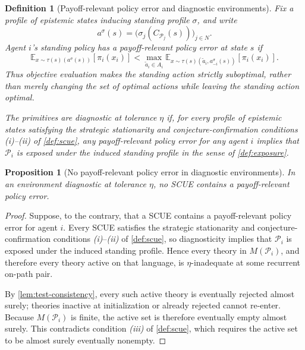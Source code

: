 \documentclass[11pt]{article}
\newtheorem{definition}[assumption]{Definition}
\newtheorem{proposition}[assumption]{Proposition}
\theoremstyle{definition}
\begin{document}
\begin{definition}[Payoff-relevant policy error and diagnostic environments]
\label{def:diagnostic}
Fix a profile of epistemic states inducing standing profile \(\sigma\), and write
\[
a^{\sigma}(s)
=
\bigl(
\sigma_j(C_{\mathcal P_j}(s))
\bigr)_{j\in N}.
\]
Agent \(i\)'s standing policy has a \emph{payoff-relevant policy error} at state \(s\) if
\[
\mathbb E_{x\sim\tau(s)(a^{\sigma}(s))}
\!\left[\pi_i(x_i)\right]
<
\max_{\widetilde a_i\in A_i}
\mathbb E_{x\sim
\tau(s)(\widetilde a_i,a_{-i}^{\sigma}(s))}
\!\left[\pi_i(x_i)\right].
\]
Thus objective evaluation makes the standing action strictly suboptimal, rather than merely changing the set of optimal actions while leaving the standing action optimal.

The primitives are \emph{diagnostic at tolerance \(\eta\)} if, for every profile of epistemic states satisfying the strategic stationarity and conjecture-confirmation conditions \emph{(i)}--\emph{(ii)} of \cref{def:scue}, any payoff-relevant policy error for any agent \(i\) implies that \(\mathcal P_i\) is exposed under the induced standing profile in the sense of \cref{def:exposure}.
\end{definition}

\begin{proposition}[No payoff-relevant policy error in diagnostic environments]
\label{prop:diagnostic}
In an environment diagnostic at tolerance \(\eta\), no SCUE contains a payoff-relevant policy error.
\end{proposition}

\begin{proof}
Suppose, to the contrary, that a SCUE contains a payoff-relevant policy error for agent \(i\).
Every SCUE satisfies the strategic stationarity and conjecture-confirmation conditions \emph{(i)}--\emph{(ii)} of \cref{def:scue}, so diagnosticity implies that \(\mathcal P_i\) is exposed under the induced standing profile.
Hence every theory in \(M(\mathcal P_i)\), and therefore every theory active on that language, is \(\eta\)-inadequate at some recurrent on-path pair.

By \cref{lem:test-consistency}, every such active theory is eventually rejected almost surely; theories inactive at initialization or already rejected cannot re-enter.
Because \(M(\mathcal P_i)\) is finite, the active set is therefore eventually empty almost surely.
This contradicts condition \emph{(iii)} of \cref{def:scue}, which requires the active set to be almost surely eventually nonempty.
\end{proof}
\end{document}
